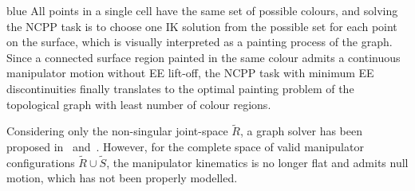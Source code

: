 \documentclass[Afour,sageh,times]{sagej}
\begin{document}
\begin{color}{blue}
All points in a single cell have the same set of possible colours, and solving the NCPP task is to choose one IK solution from the possible set for each point on the surface, which is visually interpreted as a painting process of the graph. 
Since a connected surface region painted in the same colour admits a continuous manipulator motion without EE lift-off, the NCPP task with minimum EE discontinuities finally translates to the optimal painting problem of the topological graph with least number of colour regions. 

Considering only the non-singular joint-space $\tilde{R}$, a graph solver has been proposed in~\cite{Yang2020Cellular} and~\cite{Yang2020Nonrevisiting}. 
However, for the complete space of valid manipulator configurations $\tilde{R}\cup \tilde{S}$, the manipulator kinematics is no longer flat and admits null motion, which has not been properly modelled. 
\end{color}
\end{document}
